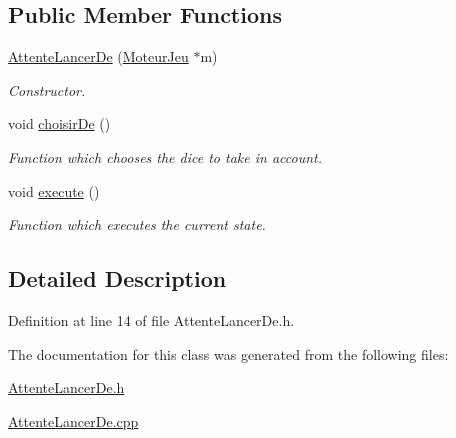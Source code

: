 \subsection*{Public Member Functions}
\begin{DoxyCompactItemize}
\item 
\hypertarget{class_attente_lancer_de_a0018e54cbed60646bea7b89f5733e22f}{
\hyperlink{class_attente_lancer_de_a0018e54cbed60646bea7b89f5733e22f}{AttenteLancerDe} (\hyperlink{class_moteur_jeu}{MoteurJeu} $\ast$m)}
\label{class_attente_lancer_de_a0018e54cbed60646bea7b89f5733e22f}

\begin{DoxyCompactList}\small\item\em Constructor. \item\end{DoxyCompactList}\item 
\hypertarget{class_attente_lancer_de_a3b2863af23392fcf6d982627957f8a99}{
void \hyperlink{class_attente_lancer_de_a3b2863af23392fcf6d982627957f8a99}{choisirDe} ()}
\label{class_attente_lancer_de_a3b2863af23392fcf6d982627957f8a99}

\begin{DoxyCompactList}\small\item\em Function which chooses the dice to take in account. \item\end{DoxyCompactList}\item 
\hypertarget{class_attente_lancer_de_a4202ca4c6fa05bba3d65eb3f099893d5}{
void \hyperlink{class_attente_lancer_de_a4202ca4c6fa05bba3d65eb3f099893d5}{execute} ()}
\label{class_attente_lancer_de_a4202ca4c6fa05bba3d65eb3f099893d5}

\begin{DoxyCompactList}\small\item\em Function which executes the current state. \item\end{DoxyCompactList}\end{DoxyCompactItemize}


\subsection{Detailed Description}


Definition at line 14 of file AttenteLancerDe.h.



The documentation for this class was generated from the following files:\begin{DoxyCompactItemize}
\item 
\hyperlink{_attente_lancer_de_8h}{AttenteLancerDe.h}\item 
\hyperlink{_attente_lancer_de_8cpp}{AttenteLancerDe.cpp}\end{DoxyCompactItemize}
